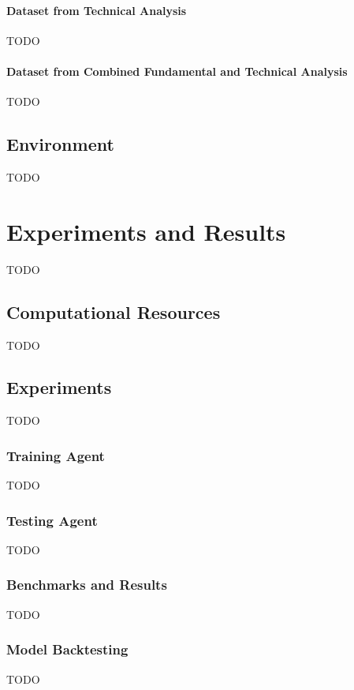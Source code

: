 \subsubsection{Dataset from Technical Analysis}\label{sec:technical-analysis}
TODO

\subsubsection{Dataset from Combined Fundamental and Technical Analysis}\label{sec:combined-fundamental-and-technical-analysis}
TODO


\section{Environment}\label{sec:environment}
TODO




\chapter{Experiments and Results}\label{sec:experiments-and-results}
TODO


\section{Computational Resources}\label{sec:computational-resources}
TODO


\section{Experiments}\label{sec:experiments}
TODO

\subsection{Training Agent}\label{sec:training-agent}
TODO

\subsection{Testing Agent}\label{sec:testing-agent}
TODO

\subsection{Benchmarks and Results}\label{sec:benchmarks-and-results}
TODO

\subsection{Model Backtesting}\label{sec:backtesting}
TODO

